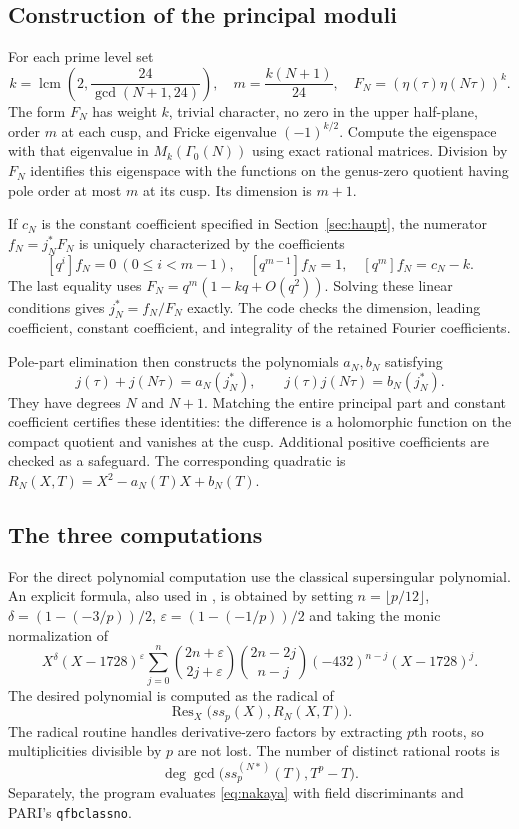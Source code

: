 \documentclass[11pt,a4paper]{article}
\theoremstyle{remark}\newtheorem{remark}[theorem]{Remark}
\numberwithin{equation}{section}
\begin{document}
	\subsection{Construction of the principal moduli}
	For each prime level set
	\[
	k=\operatorname{lcm}\left(2,\frac{24}{\gcd(N+1,24)}\right),\quad
	m=\frac{k(N+1)}{24},\quad F_N=(\eta(\tau)\eta(N\tau))^k.
	\]
	The form $F_N$ has weight $k$, trivial character, no zero in the upper half-plane, order $m$ at each cusp, and Fricke eigenvalue $(-1)^{k/2}$. Compute the eigenspace with that eigenvalue in $M_k(\Gamma_0(N))$ using exact rational matrices. Division by $F_N$ identifies this eigenspace with the functions on the genus-zero quotient having pole order at most $m$ at its cusp. Its dimension is $m+1$.
	
	If $c_N$ is the constant coefficient specified in Section~\ref{sec:haupt}, the numerator $f_N=j_N^*F_N$ is uniquely characterized by the coefficients
	\[
	[q^i]f_N=0\ (0\leq i<m-1),\quad
	[q^{m-1}]f_N=1,\quad [q^m]f_N=c_N-k.
	\]
	The last equality uses $F_N=q^m(1-kq+O(q^2))$. Solving these linear conditions gives $j_N^*=f_N/F_N$ exactly. The code checks the dimension, leading coefficient, constant coefficient, and integrality of the retained Fourier coefficients.
	
	Pole-part elimination then constructs the polynomials $a_N,b_N$ satisfying
	\[
	j(\tau)+j(N\tau)=a_N(j_N^*),\qquad
	j(\tau)j(N\tau)=b_N(j_N^*).
	\]
	They have degrees $N$ and $N+1$. Matching the entire principal part and constant coefficient certifies these identities: the difference is a holomorphic function on the compact quotient and vanishes at the cusp. Additional positive coefficients are checked as a safeguard. The corresponding quadratic is $R_N(X,T)=X^2-a_N(T)X+b_N(T)$.

\subsection{The three computations}\label{app:overview}
	For the direct polynomial computation use the classical supersingular polynomial. An explicit formula, also used in \cite{Morton5b}, is obtained by setting $n=\lfloor p/12\rfloor$, $\delta=(1-(-3/p))/2$, $\varepsilon=(1-(-1/p))/2$ and taking the monic normalization of
	\[
	X^\delta(X-1728)^\varepsilon
	\sum_{j=0}^{n}\binom{2n+\varepsilon}{2j+\varepsilon}
	\binom{2n-2j}{n-j}(-432)^{n-j}(X-1728)^j.
	\]
	The desired polynomial is computed as the radical of
	\[
	\operatorname{Res}_X\bigl(ss_p(X),R_N(X,T)\bigr).
	\]
	The radical routine handles derivative-zero factors by extracting $p$th roots, so multiplicities divisible by $p$ are not lost. The number of distinct rational roots is
	\[
	\deg\gcd\bigl(ss_p^{(N*)}(T),T^p-T\bigr).
	\]
	Separately, the program evaluates \eqref{eq:nakaya} with field discriminants and PARI's \texttt{qfbclassno}.
	
\end{document}
